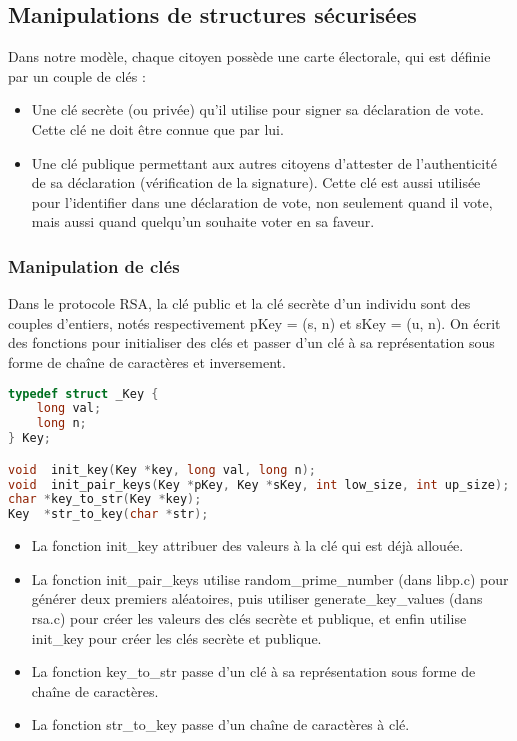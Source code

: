 \documentclass{article}
\begin{document}
\subsection{Manipulations de structures sécurisées}
Dans notre modèle, chaque citoyen possède une carte électorale, qui est définie par un couple de clés :
\begin{itemize}
    \item Une clé secrète (ou privée) qu’il utilise pour signer sa déclaration de vote. Cette clé ne doit être connue que par lui.
    \item Une clé publique permettant aux autres citoyens d’attester de l’authenticité de sa déclaration (vérification de la signature). Cette clé est aussi utilisée pour l’identifier dans une déclaration de vote, non seulement quand il vote, mais aussi quand quelqu’un souhaite voter en sa faveur.
\end{itemize}
\subsubsection{Manipulation de clés}
Dans le protocole RSA, la clé public et la clé secrète d’un individu sont des couples d’entiers, notés respectivement pKey = (s, n) et sKey = (u, n). On écrit des fonctions pour initialiser des clés et passer d'un clé à sa représentation sous forme de chaîne de caractères et inversement. 
\begin{lstlisting}[language={C}]
typedef struct _Key {
    long val;
    long n;
} Key;

void  init_key(Key *key, long val, long n);
void  init_pair_keys(Key *pKey, Key *sKey, int low_size, int up_size);
char *key_to_str(Key *key);
Key  *str_to_key(char *str);
\end{lstlisting}
\begin{itemize}
    \item La fonction init\_key attribuer des valeurs à la clé qui est déjà allouée.
    \item La fonction init\_pair\_keys utilise random\_prime\_number (dans libp.c) pour générer deux premiers aléatoires, puis utiliser generate\_key\_values (dans rsa.c) pour créer les valeurs des clés secrète et publique, et enfin utilise init\_key pour créer les clés secrète et publique.
    \item La fonction key\_to\_str  passe d'un clé à sa représentation sous forme de chaîne de caractères.
    \item La fonction str\_to\_key passe d'un chaîne de caractères à clé.
\end{itemize}
\end{document}
